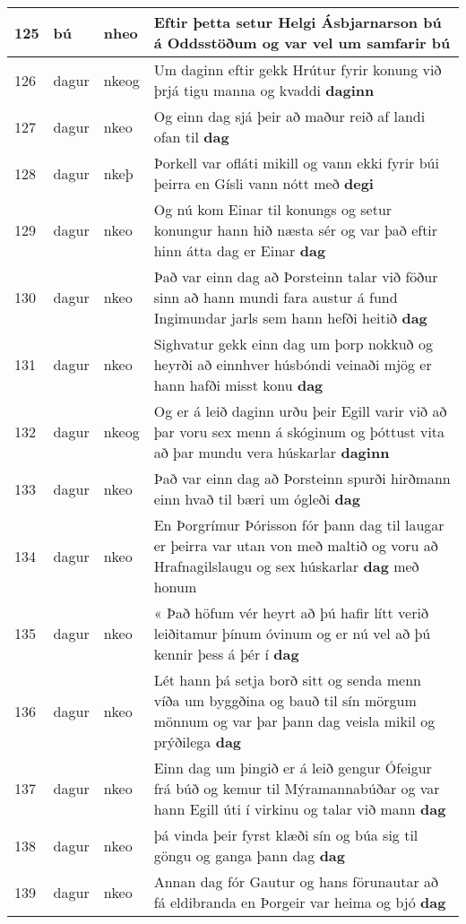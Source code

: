 \documentclass{article}
\begin{document}
\begin{longtable}{p{1cm}|p{1cm}|p{1cm}|p{13cm}}
\hline
125&bú&nheo&Eftir þetta setur Helgi Ásbjarnarson bú á Oddsstöðum og var vel um samfarir \textbf{bú} \\
\hline
126&dagur&nkeog&Um daginn eftir gekk Hrútur fyrir konung við þrjá tigu manna og kvaddi \textbf{daginn} \\
\hline
127&dagur&nkeo&Og einn dag sjá þeir að maður reið af landi ofan til \textbf{dag} \\
\hline
128&dagur&nkeþ&Þorkell var ofláti mikill og vann ekki fyrir búi þeirra en Gísli vann nótt með \textbf{degi} \\
\hline
129&dagur&nkeo&Og nú kom Einar til konungs og setur konungur hann hið næsta sér og var það eftir hinn átta dag er Einar \textbf{dag} \\
\hline
130&dagur&nkeo&Það var einn dag að Þorsteinn talar við föður sinn að hann mundi fara austur á fund Ingimundar jarls sem hann hefði heitið \textbf{dag} \\
\hline
131&dagur&nkeo&Sighvatur gekk einn dag um þorp nokkuð og heyrði að einnhver húsbóndi veinaði mjög er hann hafði misst konu \textbf{dag} \\
\hline
132&dagur&nkeog&Og er á leið daginn urðu þeir Egill varir við að þar voru sex menn á skóginum og þóttust vita að þar mundu vera húskarlar \textbf{daginn} \\
\hline
133&dagur&nkeo&Það var einn dag að Þorsteinn spurði hirðmann einn hvað til bæri um ógleði \textbf{dag} \\
\hline
134&dagur&nkeo&En Þorgrímur Þórisson fór þann dag til laugar er þeirra var utan von með maltið og voru að Hrafnagilslaugu og sex húskarlar \textbf{dag} með honum\\
\hline
135&dagur&nkeo&« Það höfum vér heyrt að þú hafir lítt verið leiðitamur þínum óvinum og er nú vel að þú kennir þess á þér í \textbf{dag} \\
\hline
136&dagur&nkeo&Lét hann þá setja borð sitt og senda menn víða um byggðina og bauð til sín mörgum mönnum og var þar þann dag veisla mikil og prýðilega \textbf{dag} \\
\hline
137&dagur&nkeo&Einn dag um þingið er á leið gengur Ófeigur frá búð og kemur til Mýramannabúðar og var hann Egill úti í virkinu og talar við mann \textbf{dag} \\
\hline
138&dagur&nkeo&þá vinda þeir fyrst klæði sín og búa sig til göngu og ganga þann dag \textbf{dag} \\
\hline
139&dagur&nkeo&Annan dag fór Gautur og hans förunautar að fá eldibranda en Þorgeir var heima og bjó \textbf{dag} \\

\end{longtable}
\end{document}
